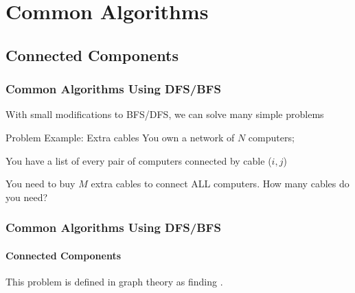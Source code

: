 \section{Common Algorithms}
\subsection{Connected Components}
\begin{frame}[fragile]
  \frametitle{Common Algorithms Using DFS/BFS}
  {\smaller
    \begin{exampleblock}{}
      With small modifications to BFS/DFS, we can solve many simple problems
    \end{exampleblock}

    \vfill

    \begin{block}{Problem Example: Extra cables}
      You own a network of $N$ computers;

      \bigskip

      You have a list of every pair of computers connected by cable ($i,j$)

      \bigskip

      You need to buy $M$ extra cables to connect ALL computers. How
      many cables do you need?
    \end{block}
  }
\end{frame}

\begin{frame}
  \frametitle{Common Algorithms Using DFS/BFS}
  \framesubtitle{Connected Components}

  This problem is defined in graph theory as finding
  .

  \begin{center}
  \end{center}
\end{frame}

